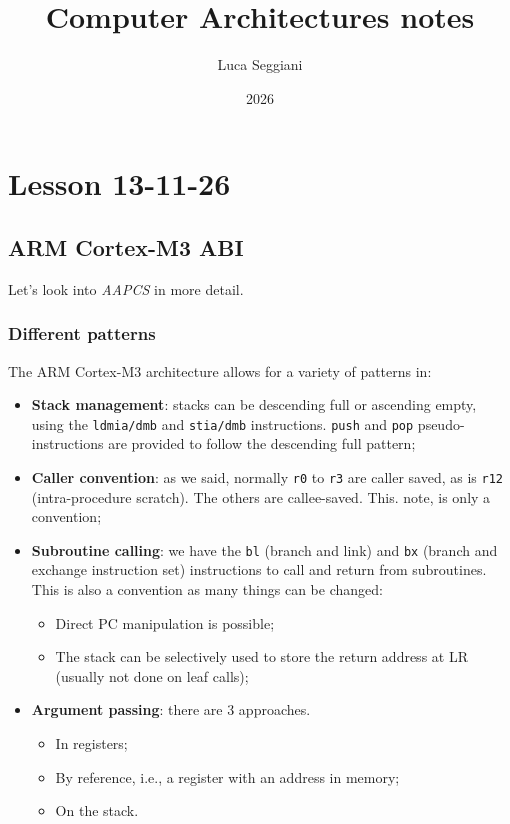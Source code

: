 \documentclass[a4paper,11pt]{article}
\title{Computer Architectures notes}
\author{Luca Seggiani}
\date{2026}
\begin{document}
\section{Lesson 13-11-26}

\thispagestyle{empty}
\pagestyle{fancy}

\subsection{ARM Cortex-M3 ABI}

Let's look into \textit{AAPCS} in more detail.

\subsubsection{Different patterns}

The ARM Cortex-M3 architecture allows for a variety of patterns in:
\begin{itemize}
	\item \textbf{Stack management}: stacks can be descending full or ascending empty, using the \texttt{ldmia/dmb} and \texttt{stia/dmb} instructions. \texttt{push} and \texttt{pop} pseudo-instructions are provided to follow the descending full pattern;
	\item \textbf{Caller convention}: as we said, normally \texttt{r0} to \texttt{r3} are caller saved, as is \texttt{r12} (intra-procedure scratch). The others are callee-saved. This. note, is only a convention;
	\item \textbf{Subroutine calling}: we have the \texttt{bl} (branch and link) and \texttt{bx} (branch and exchange instruction set) instructions to call and return from subroutines. This is also a convention as many things can be changed:
	      \begin{itemize}
		      \item Direct PC manipulation is possible;
		      \item The stack can be selectively used to store the return address at LR (usually not done on leaf calls);
	      \end{itemize}
	\item \textbf{Argument passing}: there are 3 approaches.
	      \begin{itemize}
		      \item In registers;
		      \item By reference, i.e., a register with an address in memory;
		      \item On the stack.
	      \end{itemize}
\end{itemize}
\end{document}
